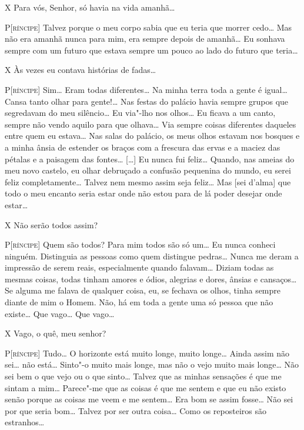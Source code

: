 \textsc{X} Para vós, Senhor, só havia na vida amanhã\ldots{}

\textsc{P[ríncipe]} Talvez porque o meu corpo sabia que eu teria que morrer
cedo\ldots{} Mas não era amanhã nunca para mim, era sempre depois de
amanhã\ldots{} Eu sonhava sempre com um futuro que estava sempre um pouco
ao lado do futuro que teria\ldots{}

\textsc{X} Às vezes eu contava histórias de fadas\ldots{}

\textsc{P[ríncipe]} Sim\ldots{} Eram todas diferentes\ldots{} Na minha terra toda a
gente é igual\ldots{} Cansa tanto olhar para gente!\ldots{} Nas festas do
palácio havia sempre grupos que segredavam do meu silêncio\ldots{} Eu
via"-lho nos olhos\ldots{} Eu ficava a um canto, sempre não vendo aquilo
para que olhava\ldots{} Via sempre coisas diferentes daqueles entre quem
eu estava\ldots{} Nas salas do palácio, os meus olhos estavam nos bosques
e a minha ânsia de estender os braços com a frescura das ervas e a
maciez das pétalas e a paisagem das fontes\ldots{} [\ldots{}] Eu nunca fui
feliz\ldots{} Quando, nas ameias do meu novo castelo, eu olhar debruçado a
confusão pequenina do mundo, eu serei feliz completamente\ldots{} Talvez
nem mesmo assim seja feliz\ldots{} Mas [sei d'alma] que
todo o meu encanto seria estar onde não estou para de lá poder
desejar onde estar\ldots{}

\textsc{X} Não serão todos assim?

\textsc{P[ríncipe]} Quem são todos? Para mim todos são só um\ldots{} Eu nunca
conheci ninguém. Distinguia as pessoas como quem distingue pedras\ldots{}
Nunca me deram a impressão de serem reais, especialmente quando
falavam\ldots{} Diziam todas as mesmas coisas, todas tinham amores e
ódios, alegrias e dores, ânsias e cansaços\ldots{} Se alguma me falava de
qualquer coisa, eu, se fechava os olhos, tinha sempre diante de mim o
Homem. Não, há em toda a gente uma só pessoa que não existe\ldots{} Que
vago\ldots{} Que vago\ldots{}

\textsc{X} Vago, o quê, meu senhor?

\textsc{P[ríncipe]} Tudo\ldots{} O horizonte está muito longe, muito longe\ldots{}
Ainda assim não sei\ldots{} não está\ldots{} Sinto"-o muito mais longe, mas não
o vejo muito mais longe\ldots{} Não sei bem o que vejo ou o que sinto\ldots{}
Talvez que as minhas sensações é que me sintam a mim\ldots{} Parece"-me que
as coisas é que me sentem e que eu não existo senão porque as coisas
me veem e me sentem\ldots{} Era bom se assim fosse\ldots{} Não sei por que
seria bom\ldots{} Talvez por ser outra coisa\ldots{} Como os reposteiros são
estranhos\ldots{}

